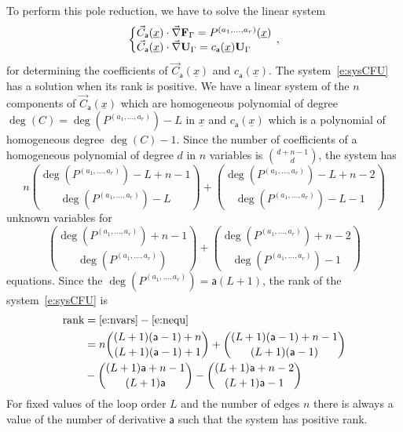 \documentclass[a4paper,12pt]{article}
\numberwithin{equation}{section}
\numberwithin{figure}{section}
\begin{document}
To perform this pole reduction, 
 we have to solve the linear system
\begin{equation}\label{e:sysCFU}
   \left\{\begin{array}{@{}l@{}}
\vec C_{\mathsf{a}} (\underline x) \cdot \vec \nabla \textbf{F}_\Gamma
            =    P^{(a_1,\dots,a_r)}(\underline x)\\
\vec C_{\mathsf{a}} (\underline x)\cdot\vec \nabla\textbf{U}_\Gamma= c_{{\mathsf{a}}}(\underline x) \textbf{U}_\Gamma 
  \end{array}\right.\,,
\end{equation}
for determining the coefficients of $\vec C_{\mathsf{a}}(\underline
x)$ and $c_{\mathsf{a}}(\underline x)$.
%
The system~\eqref{e:sysCFU} has a solution when its rank is positive.
We have a linear system of the $n$ components of $\vec C_{\mathsf{a}}(\underline
x) $ which are homogeneous polynomial of degree $\deg(C)=\deg( P^{(a_1,\dots,a_r)})-L $ in
$\underline x$ and  $ c_{{\mathsf{a}}}(\underline x) $ which is a polynomial of
homogeneous degree $\deg(C)-1$.   Since the number of coefficients of
a homogeneous polynomial of degree $d$ in $n$ variables is
$\binom{d+n-1}{d}$,  the system has
\begin{equation}\label{e:nvars}
n \binom{\deg( P^{(a_1,\dots,a_r)})-L+n-1}{\deg( P^{(a_1,\dots,a_r)})-L}+\binom{\deg( P^{(a_1,\dots,a_r)})-L+n-2}{\deg( P^{(a_1,\dots,a_r)})-L-1}
\end{equation} unknown variables for
\begin{equation}\label{e:nequ}
\binom{\deg( P^{(a_1,\dots,a_r)})+n-1}{\deg( P^{(a_1,\dots,a_r)})}+\binom{\deg( P^{(a_1,\dots,a_r)})+n-2}{\deg( P^{(a_1,\dots,a_r)})-1}
\end{equation}
equations.
%
%
Since the $\deg(P^{(a_1,\dots,a_r)})=\mathsf{a}(L+1)$, the rank of the system~\eqref{e:sysCFU} is
  \begin{align}
    \label{e:Rank}
    \textrm{rank}&=\eqref{e:nvars}-\eqref{e:nequ}\\
\nonumber    &=n \binom{(L+1)(\mathsf{a}-1)+n
               }{(L+1) (\mathsf{a}-1)+1}+\binom{(L+1)(\mathsf{a}-1)+n-1}{(L+1) (\mathsf{a}-1)}\cr
             \nonumber    &
                              -\binom{(L+1) \mathsf{a}+n-1}{(L+1) \mathsf{a}}-\binom{(L+1) \mathsf{a}+n-2}{(L+1) \mathsf{a}-1}
  \end{align}
For fixed values of the loop order $L$
and the number of edges $n$ there is always a value of the
number of derivative $\mathsf{a}$ such that the system has
positive rank.
\end{document}
